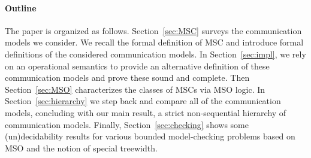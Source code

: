 \paragraph{\bf Outline} The paper is organized as follows. Section~\ref{sec:MSC} surveys the communication models we consider. We recall the formal definition of MSC and introduce formal definitions of the considered communication models.
In Section~\ref{sec:impl}, we rely on
an operational semantics to provide an alternative definition of these communication models and prove these sound and complete.
Then Section~\ref{sec:MSO} characterizes the classes of MSCs via MSO logic.
In Section~\ref{sec:hierarchy} we step back and compare all of the communication models, concluding with our main result, a strict non-sequential hierarchy of communication models.
Finally, Section~\ref{sec:checking} shows some (un)decidability results for various bounded model-checking
problems based on MSO and the notion of special treewidth.


